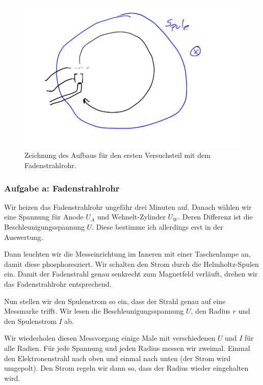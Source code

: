 \documentclass[11pt]{article}
\begin{document}
\begin{figure}[h!]
	\centering
	\includegraphics[width=\textwidth]{Aufbau_Fadenstrahlrohr.pdf}
	\caption{Zeichnung des Aufbaus für den ersten Versuchsteil mit dem Fadenstrahlrohr.}
	\label{fig:Fadenstrahlrohr}
\end{figure}

\subsubsection{Aufgabe a: Fadenstrahlrohr}

\label{Durchführung-a}

Wir heizen das Fadenstrahlrohr ungefähr drei Minuten auf. Danach wählen wir
eine Spannung für Anode $U_A$ und Wehnelt-Zylinder $U_W$. Deren Differenz ist
die Beschleunigungsspannung $U$. Diese bestimme ich allerdings erst in der
Auswertung.

Dann leuchten wir die Messeinrichtung im Inneren mit einer Taschenlampe an,
damit diese phosphoresziert. Wir schalten den Strom durch die Helmholtz-Spulen
ein. Damit der Fadenstrahl genau senkrecht zum Magnetfeld verläuft, drehen wir
das Fadenstrahlrohr entsprechend.

Nun stellen wir den Spulenstrom so ein, dass der Strahl genau auf eine
Messmarke trifft. Wir lesen die Beschleunigungsspannung $U$, den Radius $r$ und
den Spulenstrom $I$ ab.

Wir wiederholen diesen Messvorgang einige Male mit verschiedenen $U$ und $I$
für alle Radien. Für jede Spannung und jeden Radius messen wir zweimal. Einmal
den Elektronenstrahl nach oben und einmal nach unten (der Strom wird umgepolt).
Den Strom regeln wir dann so, dass der Radius wieder eingehalten wird.
\end{document}
